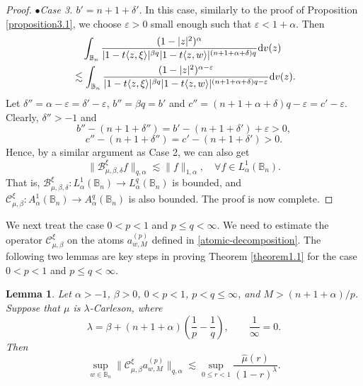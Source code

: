 \documentclass[preprint,12pt,times]{elsarticle}
\newtheorem{lemma}[theorem]{Lemma}
\theoremstyle{definition}
\theoremstyle{remark}
\numberwithin{equation}{section}
\begin{document}
\begin{proof}
$\bullet${\it Case 3. $b'=n+1+\delta'$}. In this case, similarly to the proof of Proposition \ref{proposition3.1}, we choose $\varepsilon>0$ small enough such that $\varepsilon<1+\alpha$. Then
\begin{align*}
&\quad \int_{\mathbb{B}_n}\frac{(1-|z|^2)^{\alpha}}{|1-t\langle z,\xi\rangle|^{\beta q}|1-t\langle z,w\rangle|^{(n+1+\alpha+\delta)q}}{\rm d}v(z)\\
&\lesssim \int_{\mathbb{B}_n}\frac{(1-|z|^2)^{\alpha-\varepsilon}}{|1-t\langle z,\xi\rangle|^{\beta q}|1-t\langle z,w\rangle|^{(n+1+\alpha+\delta)q-\varepsilon}}{\rm d}v(z).
\end{align*}
Let $\delta''=\alpha-\varepsilon=\delta'-\varepsilon$, $b''=\beta q=b'$ and $c''=(n+1+\alpha+\delta)q-\varepsilon=c'-\varepsilon$. Clearly, $\delta''>-1$ and
\[
    b''-(n+1+\delta'')=b'-(n+1+\delta')+\varepsilon>0,
\]
\[
    c''-(n+1+\delta'')=c'-(n+1+\delta')>0.
\]
Hence, by a similar argument as Case 2, we can also get
\[
    \big\|\mathcal{B}_{\mu,\beta,\delta}^{\xi}f\big\|_{q,\alpha}\lesssim \|f\|_{1,\alpha},\quad \forall f\in L_{\alpha}^1(\mathbb{B}_n).
\]
That is, $\mathcal{B}_{\mu,\beta,\delta}^{\xi}: L_{\alpha}^1(\mathbb{B}_n)\to L_{\alpha}^q(\mathbb{B}_n)$ is bounded, and $\mathcal{C}_{\mu,\beta}^{\xi}: A_{\alpha}^1(\mathbb{B}_n)\to A_{\alpha}^q(\mathbb{B}_n)$ is also bounded. The proof is now complete.
\end{proof}

 We next treat the case $0<p<1$ and $p\leq q<\infty$. We need to 
estimate the operator $\mathcal{C}_{\mu,\beta}^{\xi}$ on the atoms $a_{w,M}^{(p)}$ 
defined in \eqref{atomic-decomposition}. 
The following two lemmas are key steps in proving Theorem \ref{theorem1.1} 
for the case $0<p<1$ and $p\leq q<\infty$.

\begin{lemma}\label{lemma3.3}
Let \(\alpha>-1\), \(\beta>0\), \(0<p<1\), \(p<q\le\infty\), and
\(M>(n+1+\alpha)/p\). Suppose that \(\mu\) is
\(\lambda\)-Carleson, where
\[
    \lambda=\beta+(n+1+\alpha)\left(\frac{1}p-\frac{1}q\right),
    \qquad \frac{1}{\infty}=0.
\]
Then
\[
    \sup_{w\in\mathbb B_n}
    \|\mathcal C_{\mu,\beta}^{\xi}a_{w,M}^{(p)}\|_{q,\alpha}
    \lesssim
    \sup_{0\leq r<1}\frac{\widehat\mu(r)}{(1-r)^\lambda}.
\]
\end{lemma}
\end{document}

